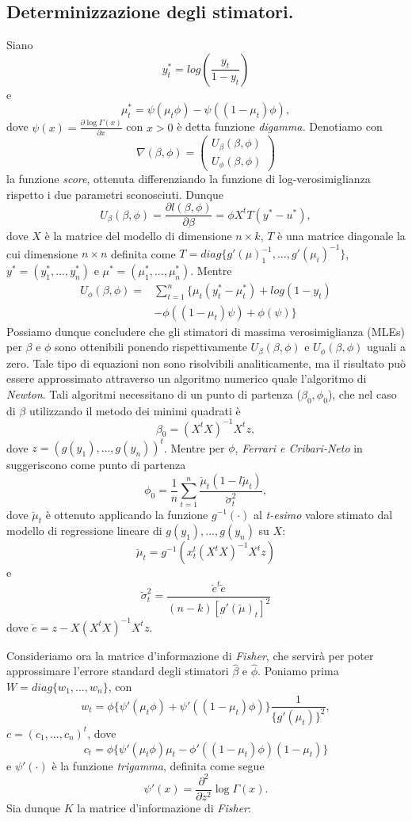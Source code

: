 \documentclass[twoside,twocolumn]{article}
\begin{document}
	\subsection{Determinizzazione degli stimatori.}
Siano$$y_t^*=log(\frac{y_t}{1-y_t})$$ e $$\mu_t^*=\psi(\mu_t\phi)-\psi((1-\mu_t)\phi),$$ dove $\psi(x)=\frac{\partial \log \Gamma(x)}{\partial x}$ con $x>0$ è detta funzione \emph{digamma.} Denotiamo con $$\nabla(\beta,\phi)=\begin{pmatrix}
U_\beta(\beta,\phi)\\U_\phi(\beta,\phi)
\end{pmatrix}$$
la funzione \emph{score}, ottenuta differenziando la funzione di log-verosimiglianza rispetto i due parametri sconosciuti. Dunque 
$$U_\beta(\beta,\phi)=\frac{\partial l(\beta,\phi)}{\partial \beta}=\phi X^tT(y^*-u^*), $$
dove $X$ è la matrice del modello di dimensione $n \times k$, $T$ è una matrice diagonale la cui dimensione $n \times n$ definita come $T=diag\{g'(\mu)_1^{-1},...,g'(\mu_i)^{-1}\}$, $y^*=(y_1^*, ..., y_n^*)$ e $\mu^*=(\mu_1^*, ..., \mu_n^*)$. Mentre \begin{align*}
U_\phi(\beta,\phi)=&\sum_{t=1}^{n}\{ \mu_t(y_t^*-\mu_t^*)
+ log(1-y_t)\\ & - \phi((1-\mu_t)\psi)+ \phi(\psi)  \}
\end{align*}
Possiamo dunque concludere che gli stimatori di massima verosimiglianza (MLEs) per $\beta$ e $\phi$ sono ottenibili ponendo rispettivamente $U_\beta(\beta,\phi)$ e $U_\phi(\beta,\phi)$ uguali a zero.
Tale tipo di equazioni non sono risolvibili analiticamente, ma il risultato può essere approssimato attraverso un  algoritmo numerico quale l'algoritmo di \emph{Newton}. Tali algoritmi necessitano di un punto di partenza ($\beta_0,\phi_0$), che nel caso di $\beta$ utilizzando il metodo dei minimi quadrati è $$ \beta_0=(X^tX)^{-1}X^tz,$$ dove  $z=(g(y_1),...,g(y_n))^t$.
Mentre per $\phi$, \emph{Ferrari e Cribari-Neto} in \cite{2004} suggeriscono  come punto di partenza $$
\phi_0=\frac{1}{n}\sum_{t=1}^{n}\frac{\breve{\mu}_t(1-l\breve{\mu}_t)}{\breve{\sigma}_t^2},
$$
dove $\breve{\mu}_t$ è ottenuto applicando la funzione $g^{-1}(\cdot)$ al \emph{t-esimo} valore stimato dal modello di regressione lineare di $g(y_1),...,g(y_n)$ su $X$: $$\breve{\mu}_t=g^{-1}(x_t^t(X^tX)^{-1}X^t z)$$  e $$ \breve{\sigma}_t^2=\frac{\breve{e}^t\breve{e}}{(n-k)[g'(\breve{\mu})_t]^2} $$
dove $\breve{e}=z-X(X^tX)^{-1}X^tz$.

Consideriamo ora la matrice d'informazione di \emph{Fisher}, che servirà per poter approssimare l'errore standard degli stimatori $\hat{\beta}$ e $\hat{\phi}$. Poniamo prima $W=diag\{w_1,...,w_n\}$, con $$w_t=\phi\{\psi'(\mu_t\phi)+ \psi'((1-\mu_t)\phi) \}\frac{1}{\{g'(\mu_t)\}^2}, $$ $c=(c_1,...,c_n)^t$,  dove $$c_t=\phi\{\psi'(\mu_t\phi)\mu_t-\phi'((1-\mu_t)\phi)(1-\mu_t) \}$$
e $\psi'(\cdot)$ è la funzione \emph{trigamma}, definita come segue $$\psi'(x)=\frac{\partial^2}{\partial z^2}\log \Gamma(x).$$
Sia dunque $K$ la matrice d'informazione di \emph{Fisher}:
\end{document}
